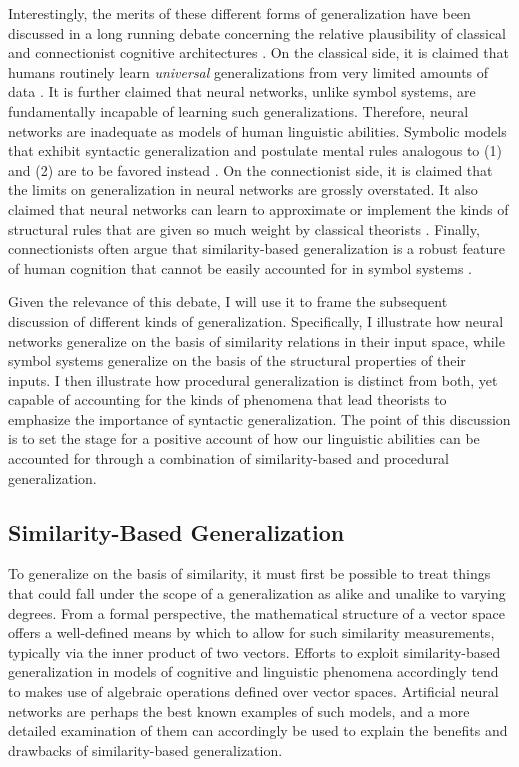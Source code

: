 Interestingly, the merits of these different forms of generalization have been discussed in a long running debate concerning the relative plausibility of classical and connectionist cognitive architectures \citep{FodorPylyshyn:1988,SmolenskyLegendre:2006}. On the classical side, it is claimed that humans routinely learn \textit{universal} generalizations from very limited amounts of data \citep{Hadley:2009,Marcus:1998}. It is further claimed that neural networks, unlike symbol systems, are fundamentally incapable of learning such generalizations. Therefore, neural networks are inadequate as models of human linguistic abilities. Symbolic models that exhibit syntactic generalization and postulate mental rules analogous to (1) and (2) are to be favored instead \citep{FodorPylyshyn:1988}. On the connectionist side, it is claimed that the limits on generalization in neural networks are grossly overstated. It also claimed that neural networks can learn to approximate or implement the kinds of structural rules that are given so much weight by classical theorists \citep{Plate:2003,SmolenskyLegendre:2006,Eliasmith:2013}. Finally, connectionists often argue that similarity-based generalization is a robust feature of human cognition that cannot be easily accounted for in symbol systems \citep{McClelland:2010}. 

Given the relevance of this debate, I will use it to frame the subsequent discussion of different kinds of generalization. Specifically, I illustrate how neural networks generalize on the basis of similarity relations in their input space, while symbol systems generalize on the basis of the structural properties of their inputs. I then illustrate how procedural generalization is distinct from both, yet capable of accounting for the kinds of phenomena that lead theorists to emphasize the importance of syntactic generalization. The point of this discussion is to set the stage for a positive account of how our linguistic abilities can be accounted for through a combination of similarity-based and procedural generalization. 

\subsection{Similarity-Based Generalization}

To generalize on the basis of similarity, it must first be possible to treat things that could fall under the scope of a generalization as alike and unalike to varying degrees. From a formal perspective, the mathematical structure of a vector space offers a well-defined means by which to allow for such similarity measurements, typically via the inner product of two vectors. Efforts to exploit similarity-based generalization in models of cognitive and linguistic phenomena accordingly tend to makes use of algebraic operations defined over vector spaces. Artificial neural networks are perhaps the best known examples of such models, and a more detailed examination of them can accordingly be used to explain the benefits and drawbacks of similarity-based generalization.

